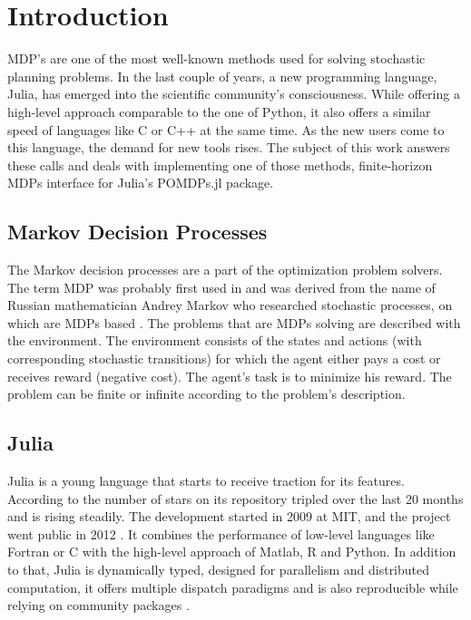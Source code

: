 
\chapter{Introduction}

MDP's are one of the most well-known methods used for solving stochastic planning problems. In the last couple of years, a new programming language, Julia, has emerged into the scientific community's consciousness. While offering a high-level approach comparable to the one of Python, it also offers a similar speed of languages like C or C++ at the same time. As the new users come to this language, the demand for new tools rises. The subject of this work answers these calls and deals with implementing one of those methods, finite-horizon MDPs interface for Julia's POMDPs.jl package.

\section{Markov Decision Processes}
The Markov decision processes are a part of the optimization problem solvers.
The term MDP was probably first used in \cite{cite:1} and was derived from the name of Russian mathematician Andrey Markov who researched stochastic processes, on which are MDPs based \cite{wiki:1}.
The problems that are MDPs solving are described with the environment. The environment consists of the states and actions (with corresponding stochastic transitions) for which the agent either pays a cost or receives reward (negative cost). The agent's task is to minimize his reward. The problem can be finite or infinite according to the problem's description.

\section{Julia}
Julia is a young language that starts to receive traction for its features. According to \cite{JuliaStars} the number of stars on its repository \cite{JuliaLang} tripled over the last 20 months and is rising steadily.
The development started in 2009 at MIT, and the project went public in 2012 \cite{JuliaHistory}. 
It combines the performance of low-level languages like Fortran or C with the high-level approach of Matlab, R and Python. In addition to that, Julia is dynamically typed, designed for parallelism and distributed computation, it offers multiple dispatch paradigms and is also reproducible while relying on community packages \cite{JuliaLangorg}.


